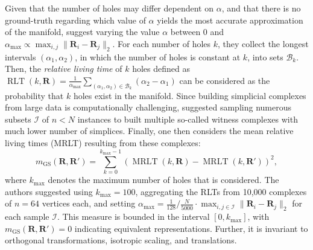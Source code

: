 \documentclass{article}
\newcommand{\citet}{\textcite}
\newcommand{\R}{\bm{R}}
\newcommand{\Rp}{\bm{R'}}
\begin{document}
Given that the number of holes may differ dependent on $\alpha$, and that there is no ground-truth regarding which value of $\alpha$ yields the most accurate approximation of the manifold, \citet{khrulkov_geometry_2018} suggest varying the value $\alpha$ between 0 and $\alpha_{\max}\propto \max_{i,j}\|\R_i-\R_j\|_2$.
For each number of holes $k$, they collect the longest intervals $(\alpha_1, \alpha_2)$, in which the number of holes is constant at $k$, into sets $\mathcal{B}_k$.
Then, the \emph{relative living time} of $k$ holes defined as
$\operatorname{RLT}(k, \R) = \frac{1}{\alpha_{\max}}\sum_{(\alpha_1, \alpha_2)\in\mathcal{B}_k} (\alpha_2-\alpha_1)$ can be considered as the probability that $k$ holes exist in the manifold.
Since building simplicial complexes from large data is computationally challenging, \citet{khrulkov_geometry_2018} suggested sampling numerous subsets  $\mathcal{I}$ of $n<N$ instances to built multiple so-called witness complexes with much lower number of simplices.
Finally, one then considers the mean relative living times (MRLT) resulting from these complexes:
\begin{equation}
    m_{\text{GS}}(\R,\Rp)= \textstyle\sum_{k=0}^{k_{\max} - 1}(\operatorname{MRLT}(k, \R) - \operatorname{MRLT}(k, \Rp))^2,
\end{equation}
where $k_{\max}$ denotes the maximum number of holes that is considered.
The authors suggested using $k_{\max}=100$,
aggregating the RLTs from 10,000 complexes of $n=64$ vertices each,
and setting $\alpha_{\max} = \tfrac{1}{128} / \tfrac{N}{5000} \cdot  \max_{i,j\in\mathcal{I}}\|\R_i-\R_j\|_2$ for each sample $\mathcal{I}$.
This measure is bounded in the interval $[0,k_{\max}]$, with $m_{\text{GS}}(\R,\Rp)=0$ indicating equivalent representations. Further, it is invariant to orthogonal transformations, isotropic scaling, and translations.
\end{document}
